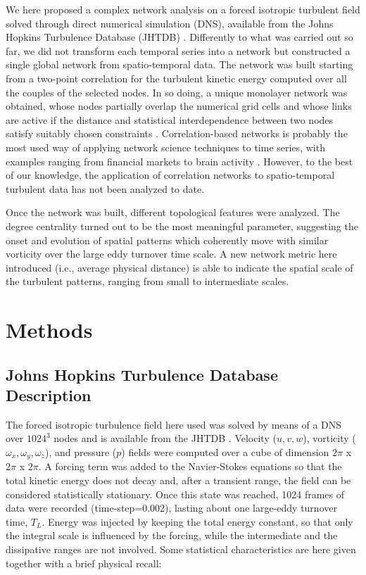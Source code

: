 \documentclass{ws-ijbc}
\begin{document}
We here proposed a complex network analysis on a forced isotropic turbulent field solved through direct numerical simulation (DNS), available from the Johns Hopkins Turbulence Database (JHTDB) \cite{JHTDB1,JHTDB2}. Differently to what was carried out so far, we did not transform each temporal series into a network but constructed a single global network from spatio-temporal data. The network was built starting from a two-point correlation for the turbulent kinetic energy computed over all the couples of the selected nodes. In so doing, a unique monolayer network was obtained, whose nodes partially overlap the numerical grid cells and whose links are active if the distance and statistical interdependence between two nodes satisfy suitably chosen constraints \cite{Donges_et_al_2009}.
Correlation-based networks \cite{Donner,Yang} is probably the most used way of applying network science techniques to time series, with examples ranging from financial markets \cite{Caraiani} to brain activity \cite{Stam}. However, to the best of our knowledge, the application of correlation networks to spatio-temporal turbulent data has not been analyzed to date.

\noindent Once the network was built, different topological features were analyzed. The degree centrality turned out to be the most meaningful parameter, suggesting the onset and evolution of spatial patterns which coherently move with similar vorticity over the large eddy turnover time scale. A new network metric here introduced (i.e., average physical distance) is able to indicate the spatial scale of the turbulent patterns, ranging from small to intermediate scales.

\section{Methods}

\subsection{Johns Hopkins Turbulence Database Description}

The forced isotropic turbulence field here used was solved by means of a DNS over $1024^3$ nodes and is available from the JHTDB \cite{JHTDB1,JHTDB2}. Velocity ($u, v, w$), vorticity ($\omega_x, \omega_y, \omega_z$), and pressure ($p$) fields were computed over a cube of dimension $2 \pi$ x $2 \pi$ x $2 \pi$. A forcing term was added to the Navier-Stokes equations so that the total kinetic energy does not decay and, after a transient range, the field can be considered statistically stationary. Once this state was reached, 1024 frames of data were recorded (time-step=0.002), lasting about one large-eddy turnover time, $T_L$. Energy was injected by keeping the total energy constant, so that only the integral scale is influenced by the forcing, while the intermediate and the dissipative ranges are not involved. Some statistical characteristics are here given together with a brief physical recall:
\end{document}
